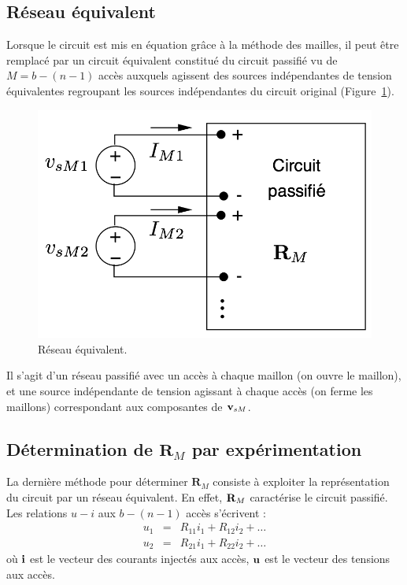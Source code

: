 \subsection{Réseau équivalent}
Lorsque le circuit est mis en équation grâce à la méthode des mailles, il peut être remplacé par un circuit équivalent constitué du
circuit passifié vu de $M=b-(n-1)$ accès auxquels agissent des sources
indépendantes de tension équivalentes regroupant les sources
indépendantes du circuit original (Figure~\ref{fig:reseau_equivalent_MM}).
\begin{figure}[htb]
	\centering
	\includegraphics[width=0.5\linewidth]{figs/methodes-generales/MM_equivalent}
	\caption{Réseau équivalent.}
	\label{fig:reseau_equivalent_MM}
\end{figure}
Il s'agit d'un réseau passifié avec un accès à chaque maillon (on ouvre le maillon), et une source indépendante de tension agissant à chaque accès (on ferme les maillons) correspondant aux composantes de ${\bf v}_{sM}$.

\subsection{Détermination de $\mathbf{R}_M$ par expérimentation}
La dernière méthode pour déterminer $\mathbf{R}_M$ consiste à exploiter la représentation du circuit par un réseau équivalent. En effet, ${\bf R}_M$ caractérise le circuit passifié. Les relations $u-i$ aux $b-(n-1)$ accès s'écrivent : 
\begin{eqnarray*}
	u_{1} & = & R_{11}i_{1} + R_{12}i_{2}+ \ldots \\
	u_{2} & = & R_{21}i_{1} + R_{22}i_{2}+ \ldots 
\end{eqnarray*}
où ${\bf i}$ est le vecteur des courants injectés aux
accès, ${\bf u}$ est le vecteur des tensions aux accès.

